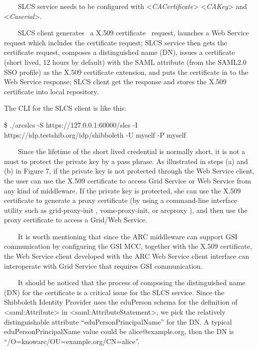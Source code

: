 \documentclass[a4paper]{article}
\newcounter{Figure}
\begin{document}
{\color{black}
\ \ \ \ SLCS service needs to be configured with
{\textless}\textit{CACertificate}{\textgreater}
{\textless}\textit{CAKey}{\textgreater} and
{\textless}\textit{Caserial}{\textgreater}.}

{\color{black}
\ \ \ \ SLCS client generates \ a X.509 certificate \ request, launches
a Web Service request which includes the certificate request; SLCS
service then gets the certificate request, composes a distinguished
name (DN), issues a certificate (short lived, 12 hours by default) with
the SAML attribute (from the SAML2.0 SSO profile) as the X.509
certificate extension, and puts the certificate in to the Web Service
response; SLCS client get the response and stores the X.509 certificate
into local repository.}

{\color{black}
The CLI for the SLCS client is like this:}

{\ttfamily\color{black}
\$ ./arcslcs -S https://127.0.0.1:60000/slcs -I
https://idp.testshib.org/idp/shibboleth -U myself -P myself}

{\color{black}
\ \ \ \ Since the lifetime of the short lived credential is normally
short, it is not a must to protect the private key by a pass phrase. As
illustrated in steps (a) and (b) in Figure 7, if the private key is not
protected through the Web Service client, the user can use the X.509
certificate to access Grid Service or Web Service from any kind of
middleware. If the private key is protected, she can use the X.509
certificate to generate a proxy certificate (by using a command-line
interface utility such as grid-proxy-init , voms-proxy-init, or
arcproxy ), and then use the proxy certificate to access a Grid/Web
Service.}

{\color{black}
\ \ \ \ It is worth mentioning that since the ARC middleware can support
GSI communication by configuring the GSI MCC, together with the X.509
certificate, the Web Service client developed with the ARC Web Service
client interface can interoperate with Grid Service that requires GSI
communication.}

{\color{black}
\ \ \ \ It should be noticed that the process of composing the
distinguished name (DN) for the certificate is a critical issue for the
SLCS service. Since the Shibboleth Identity Provider uses the eduPerson
schema for the definition of {\textless}saml:Attribute{\textgreater} in
{\textless}saml:AttributeStatement{\textgreater}, we pick the
relatively distinguishable attribute
{\textquotedblleft}eduPersonPrincipalName{\textquotedblright} for the
DN. A typical eduPersonPrincipalName value could be alice@example.org,
then the DN is
{\textquotedblleft}/O=knowarc/OU=example.org/CN=alice{\textquotedblright}.}
\end{document}
